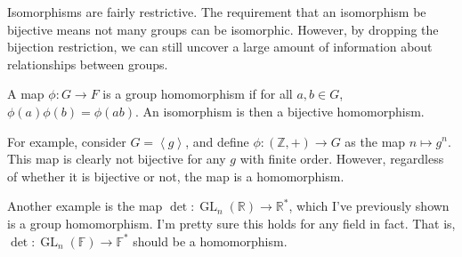 
Isomorphisms are fairly restrictive. The requirement that an isomorphism be bijective means not many groups can be isomorphic. However, by dropping the bijection restriction, we can still uncover a large amount of information about relationships between groups.

\begin{definition}[Homomorphism]\label{dfn:sak}
	A map $\phi : G \to F$ is a group homomorphism if for all $a,b\in G$, $\phi (a)\phi (b)=\phi (ab)$. An isomorphism is then a bijective homomorphism.
\end{definition}

For example, consider $G=\left<g \right>$, and define $\phi : (\mathbb{Z},+) \to G$ as the map $n\mapsto g^n$. This map is clearly not bijective for any $g$ with finite order. However, regardless of whether it is bijective or not, the map is a homomorphism.

Another example is the map $\det : \operatorname{GL}_n(\mathbb{R})  \to \mathbb{R}^*$, which I've previously shown is a group homomorphism. I'm pretty sure this holds for any field in fact. That is, $\det : \operatorname{GL}_n(\mathbb{F})  \to \mathbb{F}^*$ should be a homomorphism.

